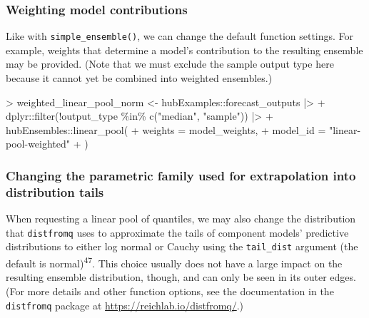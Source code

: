 \documentclass[
]{article}
\newenvironment{Shaded}{\begin{snugshade}}{\end{snugshade}}
\newcommand{\AttributeTok}[1]{\textcolor[rgb]{0.40,0.45,0.13}{#1}}
\newcommand{\FunctionTok}[1]{\textcolor[rgb]{0.28,0.35,0.67}{#1}}
\newcommand{\NormalTok}[1]{\textcolor[rgb]{0.00,0.23,0.31}{#1}}
\newcommand{\OtherTok}[1]{\textcolor[rgb]{0.00,0.23,0.31}{#1}}
\newcommand{\SpecialCharTok}[1]{\textcolor[rgb]{0.37,0.37,0.37}{#1}}
\newcommand{\StringTok}[1]{\textcolor[rgb]{0.13,0.47,0.30}{#1}}
\begin{document}
\subsubsection{Weighting model
contributions}\label{weighting-model-contributions-1}

Like with \texttt{simple\_ensemble()}, we can change the default
function settings. For example, weights that determine a model's
contribution to the resulting ensemble may be provided. (Note that we
must exclude the sample output type here because it cannot yet be
combined into weighted ensembles.)

\begin{Shaded}
\begin{Highlighting}[]
\SpecialCharTok{\textgreater{}}\NormalTok{ weighted\_linear\_pool\_norm }\OtherTok{\textless{}{-}}\NormalTok{ hubExamples}\SpecialCharTok{::}\NormalTok{forecast\_outputs }\SpecialCharTok{|\textgreater{}}
\SpecialCharTok{+}\NormalTok{   dplyr}\SpecialCharTok{::}\FunctionTok{filter}\NormalTok{(}\SpecialCharTok{!}\NormalTok{output\_type }\SpecialCharTok{\%in\%} \FunctionTok{c}\NormalTok{(}\StringTok{"median"}\NormalTok{, }\StringTok{"sample"}\NormalTok{)) }\SpecialCharTok{|\textgreater{}}
\SpecialCharTok{+}\NormalTok{   hubEnsembles}\SpecialCharTok{::}\FunctionTok{linear\_pool}\NormalTok{(}
\SpecialCharTok{+}     \AttributeTok{weights =}\NormalTok{ model\_weights,}
\SpecialCharTok{+}     \AttributeTok{model\_id =} \StringTok{"linear{-}pool{-}weighted"}
\SpecialCharTok{+}\NormalTok{ )}
\end{Highlighting}
\end{Shaded}

\subsubsection{Changing the parametric family used for extrapolation
into distribution
tails}\label{changing-the-parametric-family-used-for-extrapolation-into-distribution-tails}

When requesting a linear pool of quantiles, we may also change the
distribution that \texttt{distfromq} uses to approximate the tails of
component models' predictive distributions to either log normal or
Cauchy using the \texttt{tail\_dist} argument (the default is
normal)\textsuperscript{47}. This choice usually does not have a large
impact on the resulting ensemble distribution, though, and can only be
seen in its outer edges. (For more details and other function options,
see the documentation in the \texttt{distfromq} package at
\url{https://reichlab.io/distfromq/}.)
\end{document}

